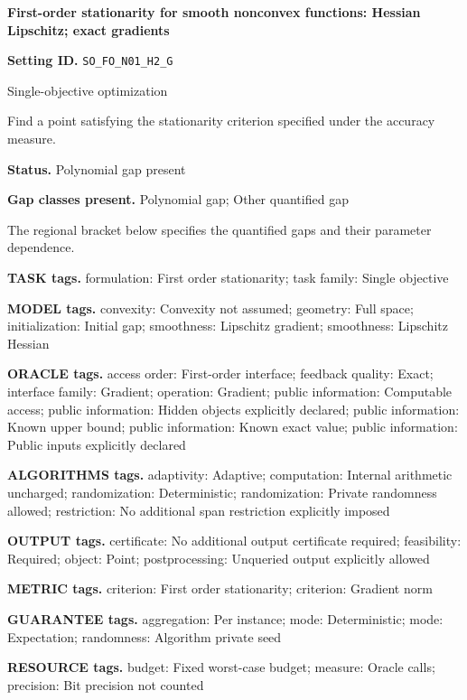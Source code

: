 \documentclass[10pt,a4paper]{article}
\begin{document}
\raggedright

{\LARGE\bfseries\sffamily\color{AtlasNavy} First-order stationarity for smooth nonconvex functions: Hessian Lipschitz; exact gradients\par}\vspace{5pt}
\textbf{Setting ID.} \texttt{SO\_\allowbreak{}FO\_\allowbreak{}N01\_\allowbreak{}H2\_\allowbreak{}G}

Single-objective optimization

Find a point satisfying the stationarity criterion specified under the accuracy measure.

\textbf{Status.} Polynomial gap present

\textbf{Gap classes present.} Polynomial gap; Other quantified gap

The regional bracket below specifies the quantified gaps and their parameter dependence.

\textbf{TASK tags.} formulation: First order stationarity; task family: Single objective

\textbf{MODEL tags.} convexity: Convexity not assumed; geometry: Full space; initialization: Initial gap; smoothness: Lipschitz gradient; smoothness: Lipschitz Hessian

\textbf{ORACLE tags.} access order: First-order interface; feedback quality: Exact; interface family: Gradient; operation: Gradient; public information: Computable access; public information: Hidden objects explicitly declared; public information: Known upper bound; public information: Known exact value; public information: Public inputs explicitly declared

\textbf{ALGORITHMS tags.} adaptivity: Adaptive; computation: Internal arithmetic uncharged; randomization: Deterministic; randomization: Private randomness allowed; restriction: No additional span restriction explicitly imposed

\textbf{OUTPUT tags.} certificate: No additional output certificate required; feasibility: Required; object: Point; postprocessing: Unqueried output explicitly allowed

\textbf{METRIC tags.} criterion: First order stationarity; criterion: Gradient norm

\textbf{GUARANTEE tags.} aggregation: Per instance; mode: Deterministic; mode: Expectation; randomness: Algorithm private seed

\textbf{RESOURCE tags.} budget: Fixed worst-case budget; measure: Oracle calls; precision: Bit precision not counted
\end{document}

